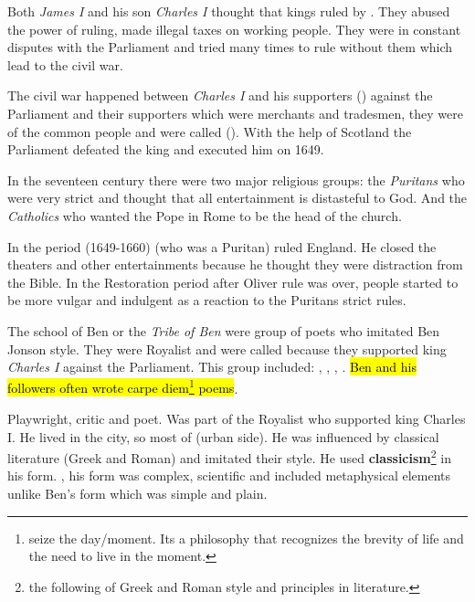 

Both \textit{James I} and his son \textit{Charles I} thought that kings ruled 
by . They abused the power of ruling, made illegal taxes
on working people. They were in constant disputes with the Parliament and tried 
many times to rule without them which lead to the civil war.


The civil war happened between \textit{Charles I} and his supporters 
() against the Parliament and their supporters which were
merchants and tradesmen, they were of the common people and were called (). 
With the help of Scotland the Parliament defeated the king and executed him on 1649.


In the seventeen century there were two major religious groups: the
\textit{Puritans} who were very strict and thought that all entertainment is
distasteful to God. And the \textit{Catholics} who wanted the Pope in Rome to 
be the head of the church.\medbreak

In the period (1649-1660)  (who was a Puritan) ruled England. He closed the 
theaters and other entertainments because he thought they were distraction
from the Bible. In the Restoration period after Oliver rule was over, 
people started to be more vulgar and indulgent as a reaction to the Puritans strict rules.


The school of Ben or the \textit{Tribe of Ben} were group of poets who imitated
Ben Jonson style. They were Royalist and were called  because they
supported king \textit{Charles I} against the Parliament. This group included: 
, , 
, . \hl{Ben and his followers often wrote 
carpe diem\footnote{seize the day/moment. Its a philosophy that recognizes the brevity of life
and the need to live in the moment.} poems}.\medbreak


Playwright, critic and poet. Was part of the Royalist who supported 
king Charles I. He lived in the city, 
so most of  (urban side). He was influenced by classical 
literature (Greek and Roman) and imitated their style. He used
\textbf{classicism}\footnote{the following of Greek and Roman style and 
principles in literature.} 
in his form. , his 
form was complex, scientific and included metaphysical elements unlike
Ben's form which was simple and plain.


